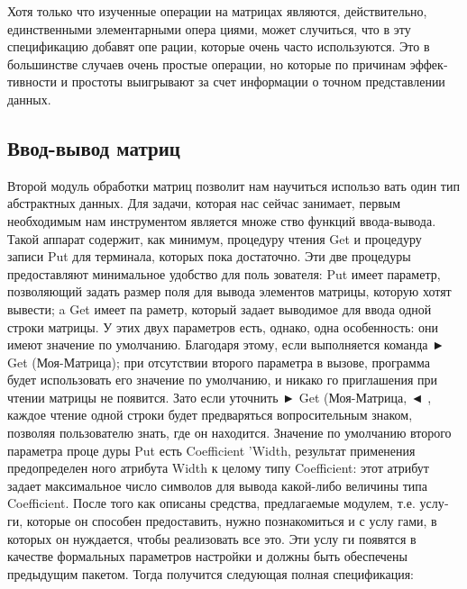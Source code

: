 \documentclass{../../template/mai_book}
\begin{document}
\begin{mynotice}
Хотя только что изученные операции на матрицах
являются, действительно, единственными элементарными опера­
циями, может случиться, что в эту спецификацию добавят опе­
рации, которые очень часто используются. Это в большинстве
\newpage
случаев очень простые операции, но которые по причинам эффек­
тивности и простоты выигрывают за счет информации о точном
представлении данных.
\end{mynotice}

\subsection{Ввод-вывод матриц}

Второй модуль обработки матриц позволит нам научиться использо­
вать один тип абстрактных данных. Для задачи, которая нас сейчас
занимает, первым необходимым нам инструментом является множе­
ство функций ввода-вывода. Такой аппарат содержит, как минимум,
процедуру чтения Get и процедуру записи Put для терминала, которых
пока достаточно.
Эти две процедуры предоставляют минимальное удобство для поль­
зователя: Put имеет параметр, позволяющий задать размер поля для
вывода элементов матрицы, которую хотят вывести; a Get имеет па­
раметр, который задает выводимое для ввода одной строки матрицы.
У этих двух параметров есть, однако, одна особенность: они имеют
значение по умолчанию. Благодаря этому, если выполняется команда
► Get (Моя-Матрица);
при отсутствии второго параметра в вызове,
программа будет использовать его значение по умолчанию, и никако­
го приглашения при чтении матрицы не появится. Зато если уточнить
► Get (Моя-Матрица,
◄ , каждое чтение одной строки будет
предваряться вопросительным знаком, позволяя пользователю знать,
где он находится. Значение по умолчанию второго параметра проце­
дуры Put есть Coefficient ’Width, результат применения предопределен­
ного атрибута Width к целому типу Coefficient: этот атрибут задает
максимальное число символов для вывода какой-либо величины типа
Coefficient.
После того как описаны средства, предлагаемые модулем, т.е. услу­
ги, которые он способен предоставить, нужно познакомиться и с услу­
гами, в которых он нуждается, чтобы реализовать все это. Эти услу­
ги появятся в качестве формальных параметров настройки и должны
быть обеспечены предыдущим пакетом. Тогда получится следующая
полная спецификация:
\end{document}
